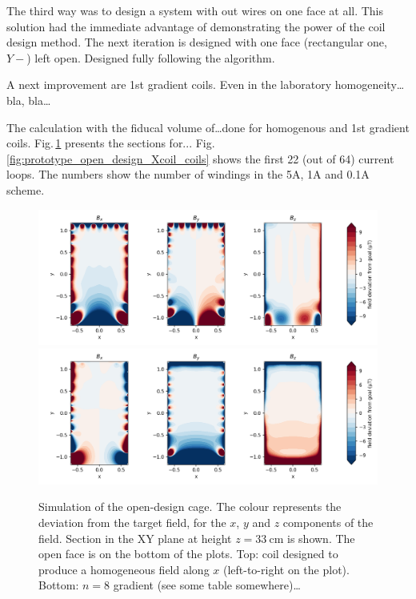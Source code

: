 The third way was to design a system with out wires on one face at all. This solution had the immediate advantage of demonstrating the power of the coil design method. The next iteration is designed with one face (rectangular one, $Y-$) left open. Designed fully following the algorithm.

A next improvement are 1st gradient coils. Even in the laboratory homogeneity\ldots bla, bla\ldots

The calculation with the fiducal volume of\ldots done for homogenous and 1st gradient coils. Fig.\,\ref{fig:prototype_open_design_simulation} presents the sections for... Fig.\,\ref{fig:prototype_open_design_Xcoil_coils} shows the first 22 (out of 64) current loops.  The numbers show the number of windings in the 5A, 1A and 0.1A scheme.

\begin{figure}
  \centering
  \includegraphics[width=\linewidth]{gfx/prototype/open_design_Xcoil_field_XY_z0_33.png}
  \includegraphics[width=\linewidth]{gfx/prototype/open_design_n8coil_field_XY_z0_33.png}
  \caption{Simulation of the open-design cage. The colour represents the deviation from the target field, for the $x$, $y$ and $z$ components of the field. Section in the XY plane at height $z=\SI{33}{\centi\meter}$ is shown. The open face is on the bottom of the plots. Top: coil designed to produce a homogeneous field along $x$ (left-to-right on the plot). Bottom: $n=8$ gradient (see some table somewhere)\ldots}
  \label{fig:prototype_open_design_simulation}
\end{figure}


